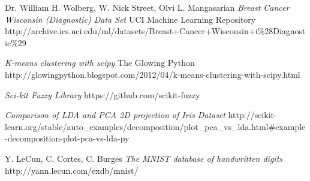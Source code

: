 \documentclass{article}
\begin{document}
\begin{thebibliography}{9}
  Dr. William H. Wolberg, W. Nick Street, Olvi L. Mangasarian 
  \emph{Breast Cancer Wisconsin (Diagnostic) Data Set}
  UCI Machine Learning Repository 
  http://archive.ics.uci.edu/ml/datasets/Breast+Cancer+Wisconsin+i\%28Diagnostic\%29
                                                                                        
  \emph{K-means clustering with scipy}
  The Glowing Python
  http://glowingpython.blogspot.com/2012/04/k-means-clustering-with-scipy.html
                                                                                        
  \emph{Sci-kit Fuzzy Library}
  https://github.com/scikit-fuzzy                       
                                                                                        
    \emph{Comparison of LDA and PCA 2D projection of Iris Dataset}
    http://scikit-learn.org/stable/auto\_examples/decomposition/plot\_pca\_vs\_lda.html\#example-decomposition-plot-pca-vs-lda-py

    Y. LeCun, C. Cortes, C. Burges
    \emph{The MNIST database of handwritten digits}
    http://yann.lecun.com/exdb/mnist/

\end{thebibliography}
\end{document}
